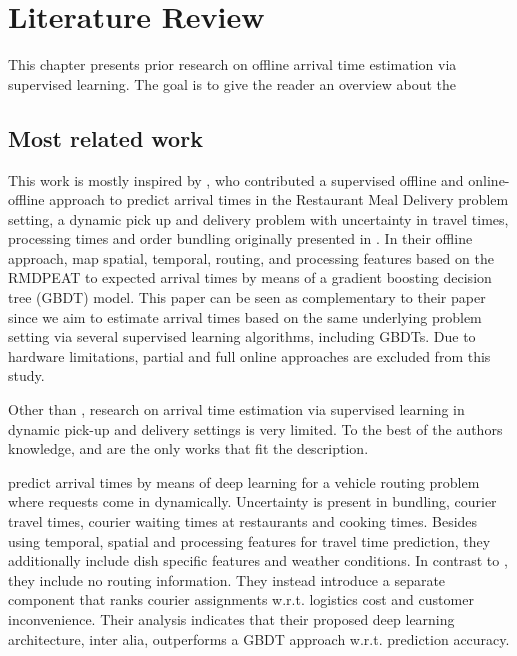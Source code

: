 \chapter{Literature Review}

This chapter presents prior research on offline arrival time estimation via supervised learning. The goal is to give the reader an overview about the   


\section{Most related work}
This work is mostly inspired by \cite{Hildebrandt2020_EAT}, who contributed a supervised offline and online-offline approach to predict arrival times in the Restaurant Meal Delivery problem setting, a dynamic pick up and delivery problem with uncertainty in travel times, processing times and order bundling originally  presented in \cite{UlmerRMDP}.
In their offline approach, \cite{Hildebrandt2020_EAT} map spatial, temporal, routing, and processing features based on the RMDPEAT to expected arrival times by means of a gradient boosting decision tree (GBDT) model. This paper can be seen as complementary to their paper since we aim to estimate arrival times based on the same underlying problem setting via several supervised learning algorithms, including GBDTs. Due to hardware limitations, partial and full online approaches are excluded from this study. 

Other than \cite{Hildebrandt2020_EAT}, research on arrival time estimation via supervised learning in dynamic pick-up and delivery settings is very limited. To the best of the authors knowledge, \cite{Zhu2020_OFCTE_DL} and \cite{Liu2018_LM_PLM} are the only works that fit the description. 

\cite{Zhu2020_OFCTE_DL} predict arrival times by means of deep learning for a vehicle routing problem where requests come in dynamically. Uncertainty is present in bundling, courier travel times, courier waiting times at restaurants and cooking times. Besides using temporal, spatial and processing features for travel time prediction, they additionally include dish specific features and weather conditions. In contrast to \cite{Hildebrandt2020_EAT}, they include no routing information. They instead introduce a separate component that ranks courier assignments w.r.t. logistics cost and customer inconvenience. Their analysis indicates that their proposed deep learning architecture, inter alia, outperforms a GBDT approach w.r.t. prediction accuracy.

